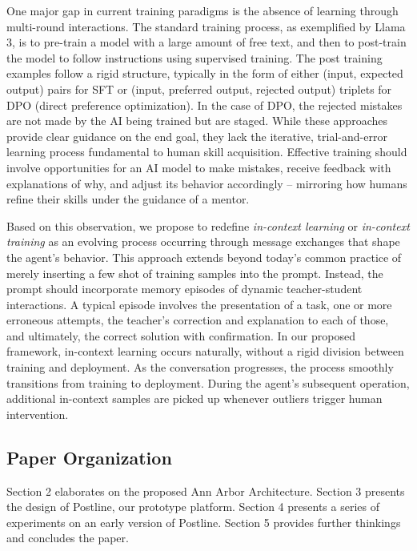 One major gap in current training paradigms is the absence of learning through multi-round interactions.
The standard training process, as exemplified by Llama 3\cite{llama24}, is to pre-train a model with a large amount of free text, and then to post-train the model to follow instructions using supervised training.  The post training examples follow a rigid structure, typically in the form of either (input, expected output) pairs for SFT \cite{wei01,sanh21,wang22} or (input, preferred output, rejected output) triplets for DPO (direct preference optimization)\cite{dpo24}. In the case of DPO, the rejected mistakes are not made by the AI being trained but are staged.  While these approaches provide clear guidance on the end goal, they lack the iterative, trial-and-error learning process fundamental to human skill acquisition. Effective training should involve opportunities for an AI model to make mistakes, receive feedback with explanations of why, and adjust its behavior accordingly -- mirroring how humans refine their skills under the guidance of a mentor.

Based on this observation, we propose to redefine \emph{in-context learning}  or \emph{in-context training} as an evolving process occurring through message exchanges that shape the agent's behavior. This approach extends beyond today's common practice of merely inserting a few shot of training samples into the prompt. Instead, the prompt should incorporate memory episodes of dynamic teacher-student interactions. A typical episode involves the presentation of a task, one or more erroneous attempts, the teacher’s correction and explanation to each of those, and ultimately, the correct solution with confirmation.  In our proposed framework, in-context learning occurs naturally, without a rigid division between training and deployment. As the conversation progresses, the process smoothly transitions from training to deployment.  During the agent's subsequent operation, additional in-context samples are picked up whenever outliers trigger human intervention.  

\subsection{Paper Organization}

Section 2 elaborates on the proposed Ann Arbor Architecture. Section 3 presents the design of Postline, our prototype platform. Section 4 presents a series of experiments on an early version of Postline. Section 5 provides further thinkings and concludes the paper.
